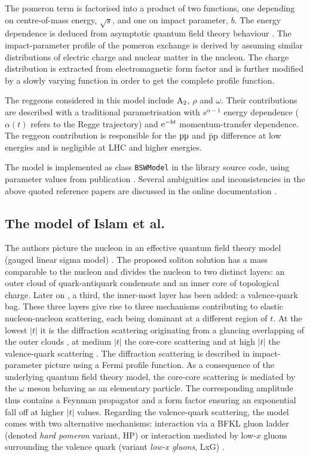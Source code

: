 \documentclass[preprint,12pt]{elsarticle}
\def\class#1{{\tt #1}}
\def\e{{\rm e}}
\begin{document}
The pomeron term is factorised into a product of two functions, one depending on centre-of-mass energy, $\sqrt s$, and one on impact parameter, $b$. The energy dependence is deduced from asymptotic quantum field theory behaviour \cite{wu70}. The impact-parameter profile of the pomeron exchange is derived by assuming similar distributions of electric charge and nuclear matter in the nucleon. The charge distribution is extracted from electromagnetic form factor and is further modified by a slowly varying function in order to get the complete profile function.

The reggeons considered in this model include $\rm A_2$, $\rho$ and $\omega$. Their contributions are described with a traditional parametrisation with $s^{\alpha - 1}$ energy dependence ($\alpha(t)$ refers to the Regge trajectory) and $\e^{-bt}$ momentum-transfer dependence. The reggeon contribution is responsible for the $\rm pp$ and $\rm \bar pp$ difference at low energies and is negligible at LHC and higher energies.

The model is implemented as class \class{BSWModel} in the library source code, using parameter values from publication \cite{bsw03}. Several ambiguities and inconsistencies in the above quoted reference papers are discussed in the online documentation \cite[Wiki section, page HMBourrely]{elegent}.

\subsection{The model of Islam et al.}

The authors picture the nucleon in an effective quantum field theory model (gauged linear sigma model) \cite{islam06}. The proposed soliton solution has a mass comparable to the nucleon and divides the nucleon to two distinct layers: an outer cloud of quark-antiquark condensate and an inner core of topological charge. Later on \cite{islam05}, a third, the inner-most layer has been added: a valence-quark bag. These three layers give rise to three mechanisms contributing to elastic nucleon-nucleon scattering, each being dominant at a different region of $t$. At the lowest $|t|$ it is the diffraction scattering originating from a glancing overlapping of the outer clouds \cite{islam84,islam87}, at medium $|t|$ the core-core scattering \cite{islam06} and at high $|t|$ the valence-quark scattering \cite{islam05,islam09}. The diffraction scattering is described in impact-parameter picture using a Fermi profile function. As a consequence of the underlying quantum field theory model, the core-core scattering is mediated by the $\omega$ meson behaving as an elementary particle. The corresponding amplitude thus contains a Feynman propagator and a form factor ensuring an exponential fall off at higher $|t|$ values. Regarding the valence-quark scattering, the model comes with two alternative mechanisms: interaction via a BFKL gluon ladder (denoted {\em hard pomeron} variant, HP) \cite{islam05} or interaction mediated by low-$x$ gluons surrounding the valence quark (variant {\em low-x gluons}, LxG) \cite{islam09}.
\end{document}
